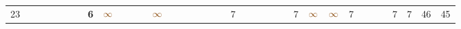 \begin{landscape}
\begin{table}
\begin{adjustwidth}{-2.6cm}{}
{\begin{tabular}{l|lllllllllllllllllllllllllllllllll|ll}
		23   &            &                                                                 &                                                                 &                                                                 &                                                                 &                                                                 & \textbf{6}                                                      & $\textcolor[rgb]{0.541,0.29,0.043}{\infty}$ &                                                                 &                                                                 &                                                                 & $\textcolor[rgb]{0.541,0.29,0.043}{\infty}$ &                                                                 &                                                                 &                                                                 &                                                                 &                                                                 &                                                                 & 7                                                               &                                                                 &                                                                 &                                                                 &                                                                 &                                                                 & 7                                                               & $\textcolor[rgb]{0.541,0.29,0.043}{\infty}$ & $\textcolor[rgb]{0.541,0.29,0.043}{\infty}$ & 7                                                               &                                                                 &                                                                 &                                                                 & 7                                                               & 7                                                               & 46         & 45          \\

\end{tabular}}
\end{adjustwidth}
\end{table}
\end{landscape}
